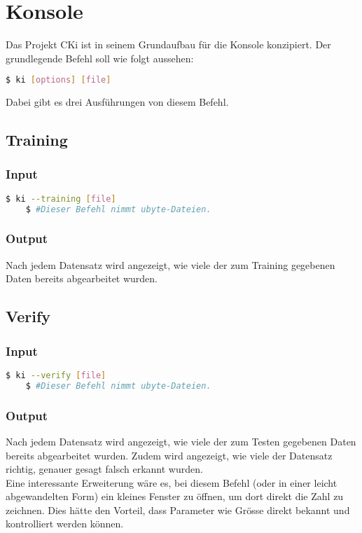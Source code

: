 \section{Konsole}
\label{sec:DesignKonsole}
Das Projekt CKi ist in seinem Grundaufbau für die Konsole konzipiert. Der grundlegende Befehl soll wie folgt aussehen: 
\begin{lstlisting}[language=bash]
	$ ki [options] [file]
\end{lstlisting}
Dabei gibt es drei Ausführungen von diesem Befehl.

\subsection{Training}
\label{sec:DesignTraining}
\subsubsection{Input}
\label{sec:DesignTraiInput}
\begin{lstlisting}[language=bash]
	$ ki --training [file]
	$ #Dieser Befehl nimmt ubyte-Dateien.
\end{lstlisting}

\subsubsection{Output}
\label{sec:TraiOutput}
Nach jedem Datensatz wird angezeigt, wie viele der zum Training gegebenen Daten bereits abgearbeitet wurden. 

\subsection{Verify}
\label{sec:DesignTest}
\subsubsection{Input}
\label{sec:DesignTestInput}
\begin{lstlisting}[language=bash]
	$ ki --verify [file]
	$ #Dieser Befehl nimmt ubyte-Dateien.
\end{lstlisting}

\subsubsection{Output}
\label{sec:TestOutput}
Nach jedem Datensatz wird angezeigt, wie viele der zum Testen gegebenen Daten bereits abgearbeitet wurden. Zudem wird angezeigt, wie viele der Datensatz richtig, genauer gesagt falsch erkannt wurden. 
\\
Eine interessante Erweiterung wäre es, bei diesem Befehl (oder in einer leicht abgewandelten Form) ein kleines Fenster zu öffnen, um dort direkt die Zahl zu zeichnen. Dies hätte den Vorteil, dass Parameter wie Grösse direkt bekannt und kontrolliert werden können.

